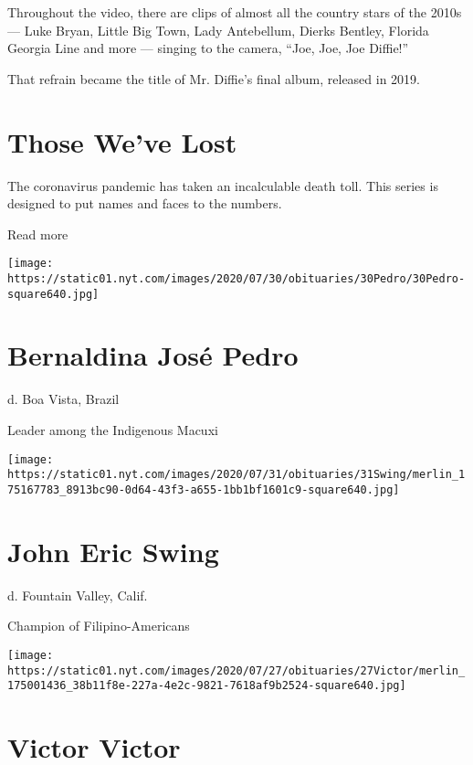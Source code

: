 Throughout the video, there are clips of almost all the country stars of
the 2010s --- Luke Bryan, Little Big Town, Lady Antebellum, Dierks
Bentley, Florida Georgia Line and more --- singing to the camera, ``Joe,
Joe, Joe Diffie!''

That refrain became the title of Mr. Diffie's final album, released in
2019.

\href{https://www.nytimes.com/interactive/2020/obituaries/people-died-coronavirus-obituaries.html?action=click\&pgtype=Article\&state=default\&region=BELOW_MAIN_CONTENT\&context=covid_obits_promo}{}

\hypertarget{those-weve-lost}{%
\section{Those We've Lost}\label{those-weve-lost}}

The coronavirus pandemic has taken an incalculable death toll. This
series is designed to put names and faces to the numbers.

Read more

\texttt{[image: https://static01.nyt.com/images/2020/07/30/obituaries/30Pedro/30Pedro-square640.jpg]}

\hypertarget{bernaldina-josuxe9-pedro}{%
\section{Bernaldina José Pedro}\label{bernaldina-josuxe9-pedro}}

d. Boa Vista, Brazil

Leader among the Indigenous Macuxi

\texttt{[image: https://static01.nyt.com/images/2020/07/31/obituaries/31Swing/merlin\_175167783\_8913bc90-0d64-43f3-a655-1bb1bf1601c9-square640.jpg]}

\hypertarget{john-eric-swing}{%
\section{John Eric Swing}\label{john-eric-swing}}

d. Fountain Valley, Calif.

Champion of Filipino-Americans

\texttt{[image: https://static01.nyt.com/images/2020/07/27/obituaries/27Victor/merlin\_175001436\_38b11f8e-227a-4e2c-9821-7618af9b2524-square640.jpg]}

\hypertarget{victor-victor}{%
\section{Victor Victor}\label{victor-victor}}


